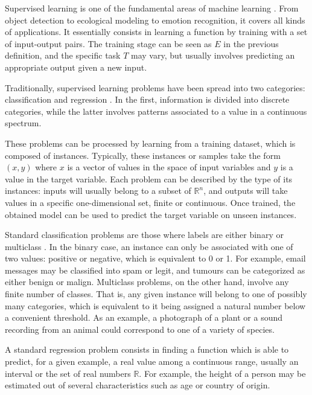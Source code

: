 Supervised learning is one of the fundamental areas of machine learning . From object detection to ecological modeling to emotion recognition, it covers all kinds of applications. It essentially consists in learning a function by training with a set of input-output pairs. The training stage can be seen as $E$ in the previous definition, and the specific task $T$ may vary, but usually involves predicting an appropriate output given a new input.

Traditionally, supervised learning problems have been spread into two categories: classification and regression . In the first, information is divided into discrete categories, while the latter involves patterns associated to a value in a continuous spectrum.

These problems can be processed by learning from a training dataset, which is composed of instances. Typically, these instances or samples take the form $(x, y)$ where $x$ is a vector of values in the space of input variables and $y$ is a value in the target variable. Each problem can be described by the type of its instances: inputs will usually belong to a subset of $\mathbb R^n$, and outputs will take values in a specific one-dimensional set, finite or continuous. Once trained, the obtained model can be used to predict the target variable on unseen instances.

Standard classification problems are those where labels are either binary or multiclass . In the binary case, an instance can only be associated with one of two values: positive or negative, which is equivalent to 0 or 1. For example, email messages may be classified into spam or legit, and tumours can be categorized as either benign or malign. Multiclass problems, on the other hand, involve any finite number of classes. That is, any given instance will belong to one of possibly many categories, which is equivalent to it being assigned a natural number below a convenient threshold. As an example, a photograph of a plant or a sound recording from an animal could correspond to one of a variety of species. 

A standard regression problem  consists in finding a function which is able to predict, for a given example, a real value among a continuous range, usually an interval or the set of real numbers $\mathbb R$. For example, the height of a person may be estimated out of several characteristics such as age or country of origin.


